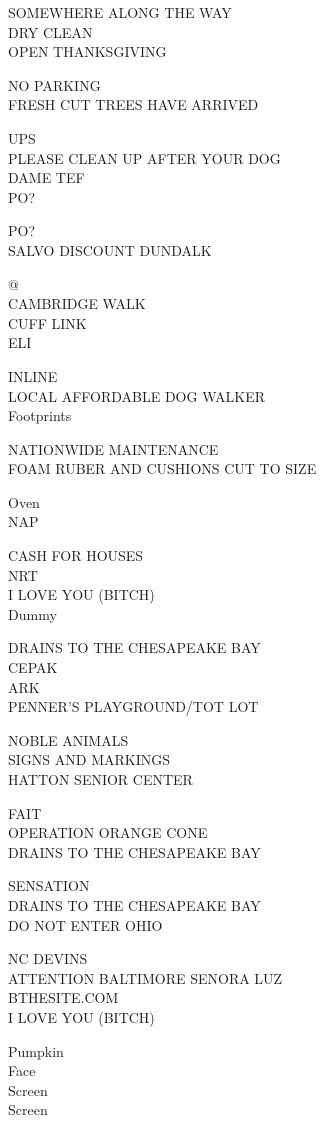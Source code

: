 \documentclass[10pt,letterpaper]{article}
\begin{document}
SOMEWHERE ALONG THE WAY\\
DRY CLEAN\\
OPEN THANKSGIVING

NO PARKING\\
FRESH CUT TREES HAVE ARRIVED

UPS\\
PLEASE CLEAN UP AFTER YOUR DOG\\
DAME TEF\\
PO?

PO?\\
SALVO DISCOUNT DUNDALK

@\\
CAMBRIDGE WALK\\
CUFF LINK\\
ELI

INLINE\\
LOCAL AFFORDABLE DOG WALKER\\
Footprints

NATIONWIDE MAINTENANCE\\
FOAM RUBER AND CUSHIONS CUT TO SIZE

Oven\\
NAP

CASH FOR HOUSES\\
NRT\\
I LOVE YOU (BITCH)\\
Dummy

DRAINS TO THE CHESAPEAKE BAY\\
CEPAK\\
ARK\\
PENNER'S PLAYGROUND/TOT LOT

NOBLE ANIMALS\\
SIGNS AND MARKINGS\\
HATTON SENIOR CENTER

FAIT\\
OPERATION ORANGE CONE\\
DRAINS TO THE CHESAPEAKE BAY

SENSATION\\
DRAINS TO THE CHESAPEAKE BAY\\
DO NOT ENTER OHIO

NC DEVINS\\
ATTENTION BALTIMORE SENORA LUZ\\
BTHESITE.COM\\
I LOVE YOU (BITCH)

Pumpkin\\
Face\\
Screen\\
Screen
\end{document}
